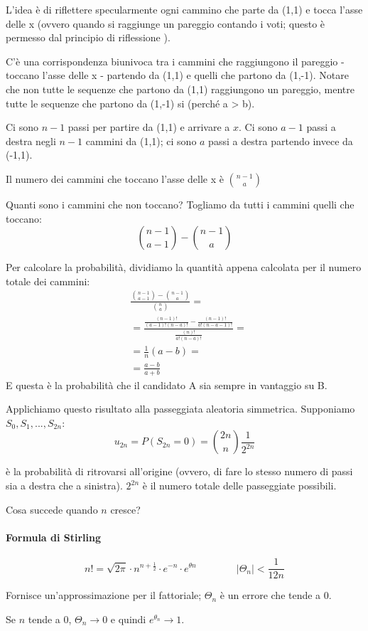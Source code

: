 \documentclass[a4paper,12pt]{book}
\newcommand\ddfrac[2]{\frac{\displaystyle #1}{\displaystyle #2}}
\begin{document}
L'idea è di riflettere specularmente ogni cammino che parte da (1,1) e tocca l'asse delle x (ovvero quando si raggiunge un pareggio contando i voti; questo è permesso dal principio di riflessione ).

C'è una corrispondenza biunivoca tra i cammini che raggiungono il pareggio - toccano l'asse delle x - partendo da (1,1) e quelli che partono da (1,-1). Notare che non tutte le sequenze che partono da (1,1) raggiungono un pareggio, mentre tutte le sequenze che partono da (1,-1) si (perché a > b).

Ci sono $ n-1 $ passi per partire da (1,1) e arrivare a $ x $. Ci sono $ a-1 $ passi a destra negli $ n-1 $ cammini da (1,1); ci sono $ a $ passi a destra partendo invece da (-1,1).

Il numero dei cammini che toccano l'asse delle x è $ \binom{n-1}{a} $

Quanti sono i cammini che non toccano? Togliamo da tutti i cammini quelli che toccano:
$$\binom{n-1}{a-1} - \binom{n-1}{a}$$

Per calcolare la probabilità, dividiamo la quantità appena calcolata per il numero totale dei cammini:
\begin{align*}
 & \ddfrac{\binom{n-1}{a-1} - \binom{n-1}{a}}{\binom{n}{a}} = \\
 & = \ddfrac{\frac{(n-1)!}{(a-1)!(n-a)!} - \frac{(n-1)!}{a!(n-a-1)!}}{\frac{(n)!}{a!(n-a)!}} = \\
 & = \frac{1}{n}(a-b) = \\
 & = \frac{a-b}{a+b}
\end{align*}
E questa è la probabilità che il candidato A sia sempre in vantaggio su B. 

Applichiamo questo risultato alla passeggiata aleatoria simmetrica. 
Supponiamo $ S_0, S_1, ..., S_{2n} $:
$$u_{2n} = P(S_{2n} = 0 ) = \binom{2n}{n}\frac{1}{2^{2n}}$$

è la probabilità di ritrovarsi all'origine (ovvero, di fare lo stesso numero di passi sia a destra che a sinistra). $ 2^{2n} $ è il numero totale delle passeggiate possibili. 

Cosa succede quando $ n $ cresce?

\begin{tcolorbox}
	\paragraph{Formula di Stirling} 
	$$ n! = \sqrt{2\pi}\cdot n^{n+\frac{1}{2}} \cdot e^{-n} \cdot e^{\theta n} \qquad \qquad |\Theta_n| < \frac{1}{12n}$$
	
	Fornisce un'approssimazione per il fattoriale; $ \Theta_n $ è un errore che tende a 0. 
	
	Se $ n $ tende a 0, $ \Theta_n \rightarrow 0 $ e quindi $ e^{\theta_n} \rightarrow 1 $.
	
\end{tcolorbox}
\end{document}
